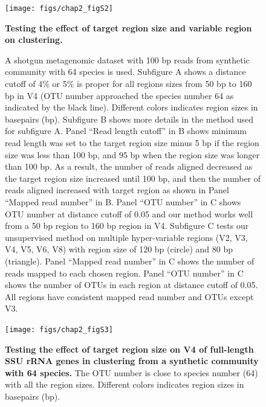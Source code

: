 \documentclass[]{msu-thesis}
\begin{document}
\begin{figure}[tbph!]
  \captionsetup{list=yes}
  \centering
  \texttt{[image: figs/chap2\_figS2]}
  \caption[Testing the effect of target region size and variable region on clustering]{\textbf{Testing the effect of target region size and variable region on clustering.}}
  \label{fig:chap2FigS2}
\end{figure}
\clearpage
\begin{figure}
  \captionsetup{labelformat=adja-page,list=no}
  \ContinuedFloat
  \caption[]{A shotgun metagenomic dataset with 100 bp reads from synthetic community with 64 species is used. Subfigure A shows a distance cutoff of 4\% or 5\% is proper for all regions sizes from 50 bp to 160 bp in V4 (OTU number approached the species number 64 as indicated by the black line). Different colors indicates region sizes in basepairs (bp).  Subfigure B shows more details in the method used for subfigure A. Panel ``Read length cutoff'' in B shows minimum read length was set to the target region size minus 5 bp if the region size was less than 100 bp, and 95 bp when the region size was longer than 100 bp. As a result, the number of reads aligned decreased as the target region size increased until 100 bp, and then the number of reads aligned increased with target region as shown in Panel ``Mapped read number'' in B. Panel ``OTU number'' in C shows OTU number at distance cutoff of 0.05 and our method works well from a 50 bp region to 160 bp region in V4. Subfigure C tests our unsupervised method on multiple hyper-variable regions (V2, V3, V4, V5, V6, V8) with region size of 120 bp (circle) and 80 bp (triangle). Panel ``Mapped read number'' in C shows the number of reads mapped to each chosen region. Panel ``OTU number'' in C shows the number of OTUs in each region at distance cutoff of 0.05. All regions have consistent mapped read number and OTUs except V3.}
  \label{fig:chap2FigS2}
\end{figure}



\begin{figure}[tbph!]
  \centering
  \texttt{[image: figs/chap2\_figS3]}
  \caption[Testing the effect of target region size on V4 of full-length SSU rRNA genes in clustering from a synthetic community with 64 species]{\textbf{Testing the effect of target region size on V4 of full-length SSU rRNA genes in clustering from a synthetic community with 64 species.} The OTU number is close to species number (64) with all the region sizes. Different colors indicates region sizes in basepairs (bp).}
  \label{fig:chap2FigS3}
\end{figure}
\end{document}
